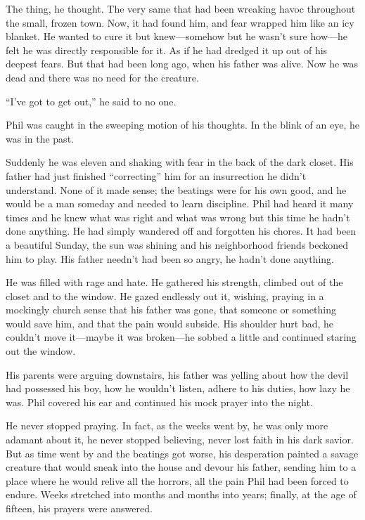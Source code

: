 \documentclass[
]{article}
\begin{document}
The thing, he thought. The very same that had been wreaking havoc
throughout the small, frozen town. Now, it had found him, and fear
wrapped him like an icy blanket. He wanted to cure it but knew---somehow
but he wasn't sure how---he felt he was directly responsible for it. As
if he had dredged it up out of his deepest fears. But that had been long
ago, when his father was alive. Now he was dead and there was no need
for the creature.

``I've got to get out,'' he said to no one.

Phil was caught in the sweeping motion of his thoughts. In the blink of
an eye, he was in the past.

Suddenly he was eleven and shaking with fear in the back of the dark
closet. His father had just finished ``correcting'' him for an
insurrection he didn't understand. None of it made sense; the beatings
were for his own good, and he would be a man someday and needed to learn
discipline. Phil had heard it many times and he knew what was right and
what was wrong but this time he hadn't done anything. He had simply
wandered off and forgotten his chores. It had been a beautiful Sunday,
the sun was shining and his neighborhood friends beckoned him to play.
His father needn't had been so angry, he hadn't done anything.

He was filled with rage and hate. He gathered his strength, climbed out
of the closet and to the window. He gazed endlessly out it, wishing,
praying in a mockingly church sense that his father was gone, that
someone or something would save him, and that the pain would subside.
His shoulder hurt bad, he couldn't move it---maybe it was broken---he
sobbed a little and continued staring out the window.

His parents were arguing downstairs, his father was yelling about how
the devil had possessed his boy, how he wouldn't listen, adhere to his
duties, how lazy he was. Phil covered his ear and continued his mock
prayer into the night.

He never stopped praying. In fact, as the weeks went by, he was only
more adamant about it, he never stopped believing, never lost faith in
his dark savior. But as time went by and the beatings got worse, his
desperation painted a savage creature that would sneak into the house
and devour his father, sending him to a place where he would relive all
the horrors, all the pain Phil had been forced to endure. Weeks
stretched into months and months into years; finally, at the age of
fifteen, his prayers were answered.
\end{document}

